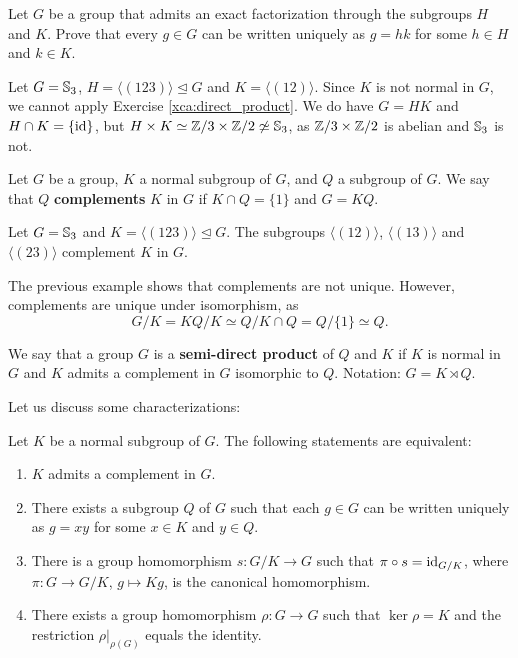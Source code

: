 \begin{exercise}
    Let $G$ be a group that admits an exact factorization through
    the subgroups $H$ and $K$. Prove that every $g\in G$ can be written 
    uniquely as $g=hk$ for some $h\in H$ and $k\in K$. 
\end{exercise}

\begin{example}
Let $G=\mathbb{S}_3$, $H=\langle (123)\rangle\unlhd G$ and $K=\langle (12)\rangle$. Since
$K$ is not normal in $G$, we cannot apply Exercise \ref{xca:direct_product}. 
We do have $G=HK$ and $H\cap K=\{\operatorname{id}\}$, but $H\times K\simeq\mathbb{Z}/3\times\mathbb{Z}/2\not\simeq\mathbb{S}_3$, 
as $\mathbb{Z}/3\times\mathbb{Z}/2$ is abelian and $\mathbb{S}_3$ is not. 
\end{example}


\begin{definition}
Let $G$ be a group, $K$ a normal subgroup of $G$, and $Q$ a subgroup of $G$. We say
that $Q$ \textbf{complements} $K$ in $G$ if $K\cap Q=\{1\}$ and $G=KQ$.
\end{definition}

\begin{example}
Let $G=\mathbb{S}_3$ and $K=\langle (123)\rangle\unlhd G$. The subgroups
$\langle (12)\rangle$, $\langle
(13)\rangle$ and $\langle (23)\rangle$ complement $K$ in $G$.
\end{example}

The previous example shows that complements are not unique. However, 
complements are unique under isomorphism, as 
\[
G/K= KQ/K\simeq Q/K\cap Q=Q/\{1\}\simeq Q.
\]

\begin{definition}
We say that a group $G$ is a \textbf{semi-direct product} of $Q$ and $K$ if $K$ 
is normal in $G$ and 
$K$ admits a complement in $G$ isomorphic to $Q$. Notation: $G=K\rtimes Q$.
\end{definition}

Let us discuss some characterizations:

\begin{proposition}
Let $K$ be a normal subgroup of $G$. The following statements are equivalent:
\begin{enumerate}
\item $K$ admits a complement in $G$.
\item There exists a subgroup $Q$ of $G$ such that each $g\in G$ can be written uniquely 
as $g=xy$ for some 
$x\in K$ and $y\in Q$.
\item There is a group homomorphism $s\colon G/K\to G$ such that $\pi\circ s=\operatorname{id}_{G/K}$, where $\pi\colon G\to G/K
$, $g\mapsto Kg$, is the canonical homomorphism.
\item There exists a group homomorphism $\rho\colon G\to G$ such that $\ker\rho=K$ and the restriction $\rho|_{\rho(G)}$ equals the identity. 
\end{enumerate}
\end{proposition}

